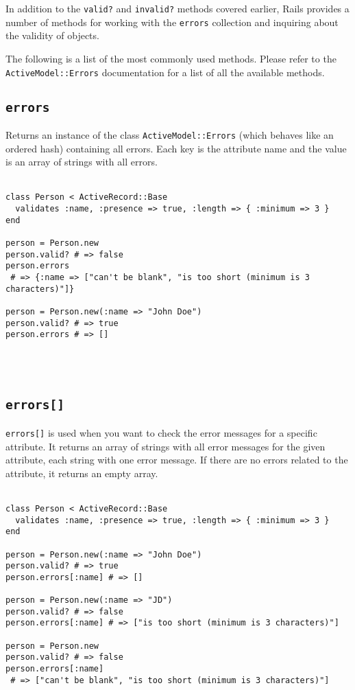 \documentclass[10pt]{book}
\begin{document}
In addition to the \texttt{valid?} and \texttt{invalid?} methods covered earlier, Rails provides a number of methods for working with the \texttt{errors} collection and inquiring about the validity of objects.

The following is a list of the most commonly used methods. Please refer to the \texttt{ActiveModel::Errors} documentation for a list of all the available methods.

\subsection{ \texttt{errors}}

Returns an instance of the class \texttt{ActiveModel::Errors} (which  behaves like an ordered hash) containing all errors. Each key is the  attribute name and the value is an array of strings with all errors.
\\ \\
\begin{minipage}{\textwidth}{\scriptsize
\begin{verbatim}
class Person < ActiveRecord::Base
  validates :name, :presence => true, :length => { :minimum => 3 }
end
 
person = Person.new
person.valid? # => false
person.errors
 # => {:name => ["can't be blank", "is too short (minimum is 3 characters)"]}
 
person = Person.new(:name => "John Doe")
person.valid? # => true
person.errors # => []
\end{verbatim}}
\end{minipage}
\\ \\

\subsection{ \texttt{errors[]}}

\texttt{errors[]} is used when you want to check the error messages  for a specific attribute. It returns an array of strings with all error  messages for the given attribute, each string with one error message. If  there are no errors related to the attribute, it returns an empty  array.
\\ \\
\begin{minipage}{\textwidth}{\scriptsize
\begin{verbatim}
class Person < ActiveRecord::Base
  validates :name, :presence => true, :length => { :minimum => 3 }
end
 
person = Person.new(:name => "John Doe")
person.valid? # => true
person.errors[:name] # => []
 
person = Person.new(:name => "JD")
person.valid? # => false
person.errors[:name] # => ["is too short (minimum is 3 characters)"]
 
person = Person.new
person.valid? # => false
person.errors[:name]
 # => ["can't be blank", "is too short (minimum is 3 characters)"]
\end{verbatim}}
\end{minipage}
\\ \\
\end{document}
